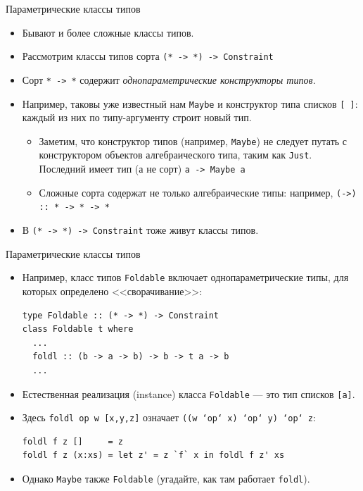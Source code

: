 \documentclass[xcolor=dvipsnames]{beamer}
\begin{document}
\begin{frame}[fragile]{Параметрические классы типов}
 
 \begin{itemize}[<+->]
  \item Бывают и более сложные классы типов. 
  \item Рассмотрим классы типов сорта \texttt{(* -> *) -> Constraint}
  \item Сорт \texttt{* -> *} содержит {\em однопараметрические конструкторы типов.} 
  \item Например, таковы уже известный нам \texttt{Maybe} и конструктор типа списков \texttt{[ ]}: каждый из них по типу-аргументу строит новый тип.
  \begin{itemize}
  \item Заметим, что конструктор типов (например, \texttt{Maybe}) не следует путать с конструктором объектов алгебраического типа, таким как \texttt{Just}. Последний имеет тип (а не сорт) \texttt{a}\texttt{ -> Maybe a}
  \item Сложные сорта содержат не только алгебраические типы: например, \texttt{(->) :: * -> * -> *}
  \end{itemize}
  \item В \texttt{(* -> *) -> Constraint}  тоже живут классы типов.
 \end{itemize}

\end{frame}

\begin{frame}[fragile]{Параметрические классы типов}

\begin{itemize}[<+->]
 \item Например, класс типов \texttt{Foldable} включает однопараметрические типы, для которых определено <<сворачивание>>:
 
{\scriptsize
\begin{verbatim}
type Foldable :: (* -> *) -> Constraint
class Foldable t where
  ...
  foldl :: (b -> a -> b) -> b -> t a -> b
  ...
\end{verbatim}

}

\item Естественная реализация (instance) класса \texttt{Foldable} --- это тип списков \texttt{[a]}.
\item Здесь \texttt{foldl op w}\texttt{ [x,y,z]} означает
\texttt{((w `op` x) `op` y) `op` z}:

{\scriptsize
\begin{verbatim}
foldl f z []     = z
foldl f z (x:xs) = let z' = z `f` x in foldl f z' xs
\end{verbatim}
}
\item Однако \texttt{Maybe} также \texttt{Foldable} (угадайте, как там работает \texttt{foldl}).

\end{itemize}

\end{frame}
\end{document}
